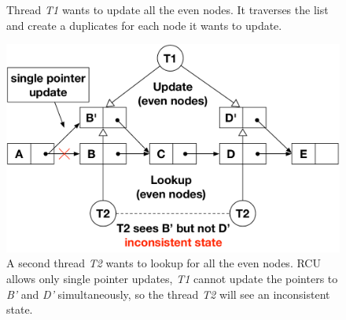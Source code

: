 \begin{refsection}
\begin{figure}
  \begin{minipage}[t]{0.47\textwidth}
    \begin{flushleft}
      \centering
      \caption{Thread \emph{T1} wants to update all the even nodes. It
        traverses the list and create a duplicates for each node it wants to
        update.}
      \label{fig:rcu_ex3}
    \end{flushleft}
  \end{minipage}
  \hfill
  \begin{minipage}[t]{0.47\textwidth}
    \begin{flushright}
      \centering
      \includegraphics[width=1.0\textwidth]{figures/rcu_ex4}
      \caption{A second thread \emph{T2} wants to lookup for all the even
        nodes. RCU allows only single pointer updates, \emph{T1} cannot update
        the pointers to \emph{B'} and \emph{D'} simultaneously, so the thread
        \emph{T2} will see an inconsistent state.}
      \label{fig:rcu_ex4}
    \end{flushright}
  \end{minipage}
  \vspace{-5pt}
\end{figure}


\end{refsection}
